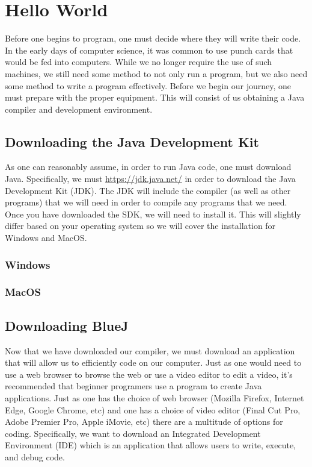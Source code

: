 
\usepackage{hyperref}


\chapter{Hello World}



Before one begins to program, one must decide where they will write their code.
In the early days of computer science, it was common to use punch cards that would be fed into computers.
While we no longer require the use of such machines, we still need some method to not only run a program, but we also need some method to write a program effectively.
Before we begin our journey, one must prepare with the proper equipment.
This will consist of us obtaining a Java compiler and development environment.


\section*{Downloading the Java Development Kit}
As one can reasonably assume, in order to run Java code, one must download Java.
Specifically, we must \url{https://jdk.java.net/} in order to download the Java Development Kit (JDK).
The JDK will include the compiler (as well as other programs) that we will need in order to compile any programs that we need.
Once you have downloaded the SDK, we will need to install it.
This will slightly differ based on your operating system so we will cover the installation for Windows and MacOS.


\subsection*{Windows}

\subsection*{MacOS}



\section*{Downloading BlueJ}
Now that we have downloaded our compiler, we must download an application that will allow us to efficiently code on our computer.
Just as one would need to use a web browser to browse the web or use a video editor to edit a video, it's recommended that beginner programers use a program to create Java applications.
Just as one has the choice of web browser (Mozilla Firefox, Internet Edge, Google Chrome, etc) and one has a choice of video editor (Final Cut Pro, Adobe Premier Pro, Apple iMovie, etc) there are a multitude of options for coding.
Specifically, we want to download an Integrated Development Environment (IDE) which is an application that allows users to write, execute, and debug code.

